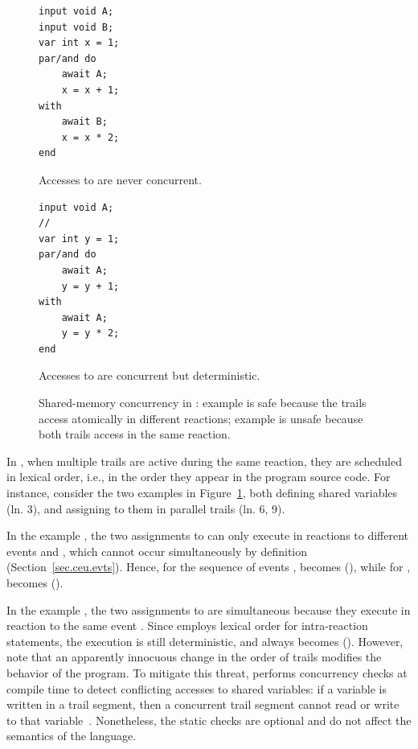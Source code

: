 \begin{figure}[h]
\begin{minipage}[h]{0.45\linewidth}
\begin{lstlisting}[numbers=right]
input void A;
input void B;
var int x = 1;
par/and do
    await A;
    x = x + 1;
with
    await B;
    x = x * 2;
end
\end{lstlisting}
\centering\small{\ax Accesses to  are never concurrent.}
\end{minipage}
%
\begin{minipage}[h]{0.53\linewidth}
\begin{lstlisting}[xleftmargin=2em]
input void A;
//
var int y = 1;
par/and do
    await A;
    y = y + 1;
with
    await A;
    y = y * 2;
end

\end{lstlisting}
\centering\small{\bx Accesses to  are concurrent but deterministic.}
\end{minipage}
\caption{ Shared-memory concurrency in \CEU:
example \ax is safe because the trails access  atomically in different
reactions;
example \bx is unsafe because both trails access  in the same reaction.
\label{lst.shared}
}
\end{figure}

In \CEU, when multiple trails are active during the same reaction, they are
scheduled in lexical order, i.e., in the order they appear in the program
source code.
%
For instance, consider the two examples in Figure~\ref{lst.shared}, both
defining shared variables (ln. 3), and assigning to them in parallel trails
(ln. 6, 9).

In the example \ax, the two assignments to  can only execute in
reactions to different events  and , which cannot occur
simultaneously by definition (Section~\ref{sec.ceu.evts}).
Hence, for the sequence of events ,  becomes 
(), while for ,  becomes 
().

In the example \bx, the two assignments to  are simultaneous because
they execute in reaction to the same event .
Since \CEU employs lexical order for intra-reaction statements, the execution
is still deterministic, and  always becomes  ().
%
However, note that an apparently innocuous change in the order of trails
modifies the behavior of the program.
%
To mitigate this threat, \CEU performs concurrency checks at compile time to
detect conflicting accesses to shared variables:
if a variable is written in a trail segment, then a concurrent trail segment
cannot read or write to that variable~\cite{ceu.sensys13}.
%
Nonetheless, the static checks are optional and do not affect the semantics of
the language.

